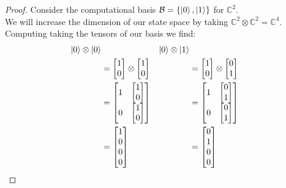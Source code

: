 \documentclass{beamer}
\renewcommand{\ket}{\Ket}
\renewcommand{\ket}{\Ket}
\newcommand{\tensor}{\otimes}
\newcommand{\bb}[1]{\mathbb{#1}}
\renewcommand{\cal}[1]{\mathcal{#1}}
\begin{document}
\begin{frame}
\begin{proof}
            Consider the computational basis $\cal{B} = \{\ket{0}, \ket{1}\}$ for $\bb{C}^2$.\\
            We will increase the dimension of our state space by taking $\bb{C}^2 \otimes \bb{C}^2 = \bb{C}^4$.\\
            Computing taking the tensors of our basis we find:
            \begin{align*}
            \ket{0} \tensor \ket{0} & & \ket{0} \tensor \ket{1}\\
            &= \begin{bmatrix} 1 \\ 0 \end{bmatrix} \tensor \begin{bmatrix} 1 \\ 0 \end{bmatrix} & &= \begin{bmatrix} 1 \\ 0 \end{bmatrix} \tensor \begin{bmatrix} 0 \\ 1 \end{bmatrix}\\
            &= \begin{bmatrix} 1 & \begin{bmatrix} 1 \\ 0 \end{bmatrix} \\ 0 & \begin{bmatrix} 1 \\ 0 \end{bmatrix} \end{bmatrix} & &= \begin{bmatrix} 1 & \begin{bmatrix} 0 \\ 1 \end{bmatrix} \\ 0 & \begin{bmatrix} 0 \\ 1 \end{bmatrix} \end{bmatrix}\\
            &= \begin{bmatrix} 1 \\ 0 \\ 0 \\ 0 \end{bmatrix} & &= \begin{bmatrix} 0 \\ 1 \\ 0 \\ 0 \end{bmatrix}
            \end{align*}


\end{proof}
\end{frame}
\end{document}
